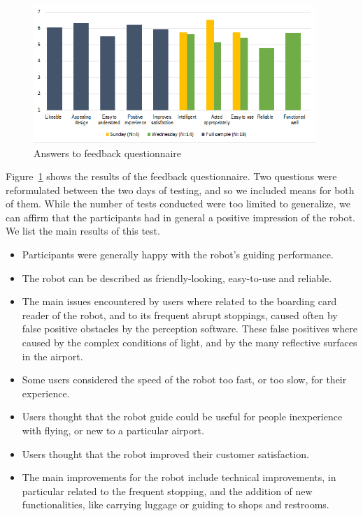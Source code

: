 \begin{figure}[tb]
  \begin{center}
  \includegraphics[width=0.95\textwidth]{img/case_study/spencer/graph_subjective_questions.png}
  \end{center}
  \caption{Answers to feedback questionnaire}
  \label{fig:feedback_questionnaire}
\end{figure}


Figure~\ref{fig:feedback_questionnaire} shows the results of the feedback questionnaire. Two questions were reformulated between the two days of testing, and so we included means for both of them. While the number of tests conducted were too limited to generalize, we can affirm that the participants had in general a positive impression of the robot. We list the main results of this test.

\begin{itemize}
\item Participants were generally happy with the robot's guiding performance.
\item The robot can be described as friendly-looking, easy-to-use and reliable.
\item The main issues encountered by users where related to the boarding card reader of the robot, and to its frequent abrupt stoppings, caused often by false positive obstacles by the perception software. These false positives where caused by the complex conditions of light, and by the many reflective surfaces in the airport.
\item Some users considered the speed of the robot too fast, or too slow, for their experience.
\item Users thought that the robot guide could be useful for people inexperience with flying, or new to a particular airport.
\item Users thought that the robot improved their customer satisfaction.
\item The main improvements for the robot include technical improvements, in particular related to the frequent stopping, and the addition of new functionalities, like carrying luggage or guiding to shops and restrooms.
\end{itemize}

